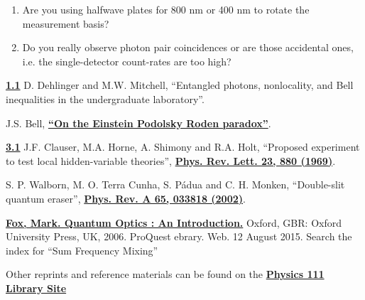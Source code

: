\documentclass{../lab}
\begin{document}
\begin{enumerate}
    \item Are you using halfwave plates for 800 nm or 400 nm to rotate the measurement basis?

    \item Do you really observe photon pair coincidences or are those accidental ones, i.e. the single-detector count-rates are too high?
\end{enumerate}

\begin{thebibliography}{}
\label{sec:References}
    \href{http://physics111.lib.berkeley.edu/Physics111/Reprints/QIE/Entangled\%20Photons-M.W.\%20Mitchell_1.1498860.pdf}{\textbf{1.1}} D. Dehlinger and M.W. Mitchell, ``Entangled photons, nonlocality, and Bell inequalities in the undergraduate laboratory''.

    J.S. Bell, \href{http://physics111.lib.berkeley.edu/Physics111/Reprints/QIE/Bell_Compact.pdf}{\textbf{``On the Einstein Podolsky Roden paradox''}}.

    \href{http://prl.aps.org/abstract/PRL/v23/i15/p880/_1}{\textbf{3.1}} J.F. Clauser, M.A. Horne, A. Shimony and R.A. Holt, ``Proposed experiment to test local hidden-variable theories'', \href{http://prl.aps.org/abstract/PRL/v23/i15/p880/_1}{\textbf{Phys. Rev. Lett. 23, 880 (1969)}}.

    S. P. Walborn, M. O. Terra Cunha, S. Pádua and C. H. Monken, ``Double-slit quantum eraser'', \href{http://physics111.lib.berkeley.edu/Physics111/Reprints/QIE/Quantum-Eraser-Walborn.pdf}{\textbf{Phys. Rev. A 65, 033818 (2002)}}.

    \href{http://site.ebrary.com/lib/berkeley/reader.action?ppg=40&docID=10177967&tm=1439419508236}{\textbf{Fox, Mark. Quantum Optics : An Introduction.}} Oxford, GBR: Oxford University Press, UK, 2006. ProQuest ebrary. Web. 12 August 2015. Search the index for ``Sum Frequency Mixing''

\end{thebibliography}

\vspace{1em}

\noindent Other reprints and reference materials can be found on the \href{\LabReprints}{\textbf{Physics 111 Library Site}}
\end{document}
